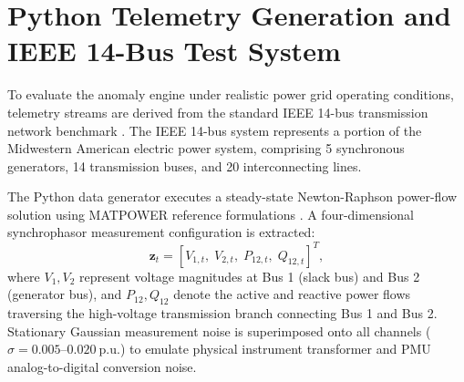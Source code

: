 \documentclass[12pt,a4paper]{report}
\begin{document}
\section{Python Telemetry Generation and IEEE 14-Bus Test System}
To evaluate the anomaly engine under realistic power grid operating conditions, telemetry
streams are derived from the standard IEEE 14-bus transmission network benchmark \cite{matpowercase14}.
The IEEE 14-bus system represents a portion of the Midwestern American electric power system,
comprising 5 synchronous generators, 14 transmission buses, and 20 interconnecting lines.

The Python data generator executes a steady-state Newton-Raphson power-flow solution using
MATPOWER reference formulations \cite{zimmerman2011,matpowercase14}. A four-dimensional synchrophasor measurement configuration
is extracted:
\begin{equation}
\boldsymbol{z}_t = [V_{1,t}, \; V_{2,t}, \; P_{12,t}, \; Q_{12,t}]^T,
\end{equation}
where $V_1, V_2$ represent voltage magnitudes at Bus 1 (slack bus) and Bus 2 (generator bus),
and $P_{12}, Q_{12}$ denote the active and reactive power flows traversing the high-voltage
transmission branch connecting Bus 1 and Bus 2. Stationary Gaussian measurement noise is
superimposed onto all channels ($\sigma = 0.005\text{--}0.020~\text{p.u.}$) to emulate physical
instrument transformer and PMU analog-to-digital conversion noise.
\end{document}
